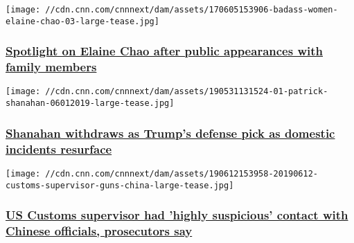\href{/2019/06/17/politics/elaine-chao-family-members-invs/index.html}{}

\texttt{[image: //cdn.cnn.com/cnnnext/dam/assets/170605153906-badass-women-elaine-chao-03-large-tease.jpg]}

\hypertarget{spotlight-on-elaine-chao-after-public-appearances-with-family-members}{%
\subsubsection{\texorpdfstring{\href{/2019/06/17/politics/elaine-chao-family-members-invs/index.html}{Spotlight
on Elaine Chao after public appearances with family
members}}{Spotlight on Elaine Chao after public appearances with family members}}\label{spotlight-on-elaine-chao-after-public-appearances-with-family-members}}

\href{/2019/06/18/politics/shanahan-out-defense-secretary/index.html}{}

\texttt{[image: //cdn.cnn.com/cnnnext/dam/assets/190531131524-01-patrick-shanahan-06012019-large-tease.jpg]}

\hypertarget{shanahan-withdraws-as-trumps-defense-pick-as-domestic-incidents-resurface-}{%
\subsubsection{\texorpdfstring{\href{/2019/06/18/politics/shanahan-out-defense-secretary/index.html}{Shanahan
withdraws as Trump's defense pick as domestic incidents resurface
}}{Shanahan withdraws as Trump's defense pick as domestic incidents resurface }}\label{shanahan-withdraws-as-trumps-defense-pick-as-domestic-incidents-resurface-}}

\href{/2019/06/13/us/customs-supervisor-guns-china-invs/index.html}{}

\texttt{[image: //cdn.cnn.com/cnnnext/dam/assets/190612153958-20190612-customs-supervisor-guns-china-large-tease.jpg]}

\hypertarget{us-customs-supervisor-had-highly-suspicious-contact-with-chinese-officials-prosecutors-say}{%
\subsubsection{\texorpdfstring{\href{/2019/06/13/us/customs-supervisor-guns-china-invs/index.html}{US
Customs supervisor had 'highly suspicious' contact with Chinese
officials, prosecutors
say}}{US Customs supervisor had 'highly suspicious' contact with Chinese officials, prosecutors say}}\label{us-customs-supervisor-had-highly-suspicious-contact-with-chinese-officials-prosecutors-say}}

